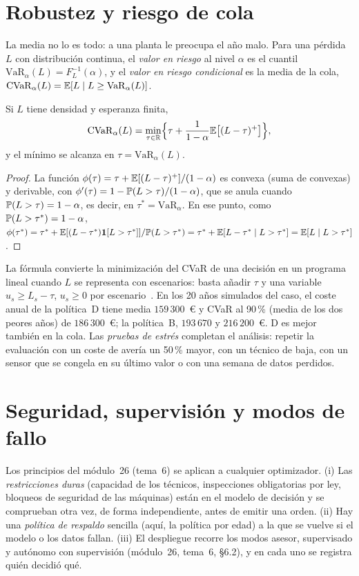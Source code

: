 \section{Robustez y riesgo de cola}

La media no lo es todo: a una planta le preocupa el año malo. Para una pérdida $L$ con distribución continua, el \emph{valor en riesgo} al nivel $\alpha$ es el cuantil $\mathrm{VaR}_\alpha(L)=F_L^{-1}(\alpha)$, y el \emph{valor en riesgo condicional} es la media de la cola, $\mathrm{CVaR}_\alpha(L)=\mathbb{E}[L\mid L\ge\mathrm{VaR}_\alpha(L)]$.

\begin{proposicion}\label{prop:cvar}
Si $L$ tiene densidad y esperanza finita,
\[
\mathrm{CVaR}_\alpha(L)=\min_{\tau\in\mathbb{R}}\Bigl\{\tau+\frac{1}{1-\alpha}\mathbb{E}\bigl[(L-\tau)^{+}\bigr]\Bigr\},
\]
y el mínimo se alcanza en $\tau=\mathrm{VaR}_\alpha(L)$.
\end{proposicion}

\begin{proof}
La función $\phi(\tau)=\tau+\mathbb{E}[(L-\tau)^{+}]/(1-\alpha)$ es convexa (suma de convexas) y derivable, con $\phi'(\tau)=1-\mathbb{P}(L>\tau)/(1-\alpha)$, que se anula cuando $\mathbb{P}(L>\tau)=1-\alpha$, es decir, en $\tau^{*}=\mathrm{VaR}_\alpha$. En ese punto, como $\mathbb{P}(L>\tau^{*})=1-\alpha$,
$\phi(\tau^{*})=\tau^{*}+\mathbb{E}[(L-\tau^{*})\mathbf{1}[L>\tau^{*}]]/\mathbb{P}(L>\tau^{*})=\tau^{*}+\mathbb{E}[L-\tau^{*}\mid L>\tau^{*}]=\mathbb{E}[L\mid L>\tau^{*}]$.
\end{proof}

La fórmula convierte la minimización del CVaR de una decisión en un programa lineal cuando $L$ se representa con escenarios: basta añadir $\tau$ y una variable $u_s\ge L_s-\tau$, $u_s\ge0$ por escenario~\cite{ru}. En los 20 años simulados del caso, el coste anual de la política~D tiene media $159\,300$~€ y CVaR al 90\,\% (media de los dos peores años) de $186\,300$~€; la política~B, $193\,670$ y $216\,200$~€. D es mejor también en la cola. Las \emph{pruebas de estrés} completan el análisis: repetir la evaluación con un coste de avería un 50\,\% mayor, con un técnico de baja, con un sensor que se congela en su último valor o con una semana de datos perdidos.

\section{Seguridad, supervisión y modos de fallo}

Los principios del módulo~26 (tema~6) se aplican a cualquier optimizador. (i) Las \emph{restricciones duras} (capacidad de los técnicos, inspecciones obligatorias por ley, bloqueos de seguridad de las máquinas) están en el modelo de decisión y se comprueban otra vez, de forma independiente, antes de emitir una orden. (ii) Hay una \emph{política de respaldo} sencilla (aquí, la política por edad) a la que se vuelve si el modelo o los datos fallan. (iii) El despliegue recorre los modos asesor, supervisado y autónomo con supervisión (módulo~26, tema~6, §6.2), y en cada uno se registra quién decidió qué.

